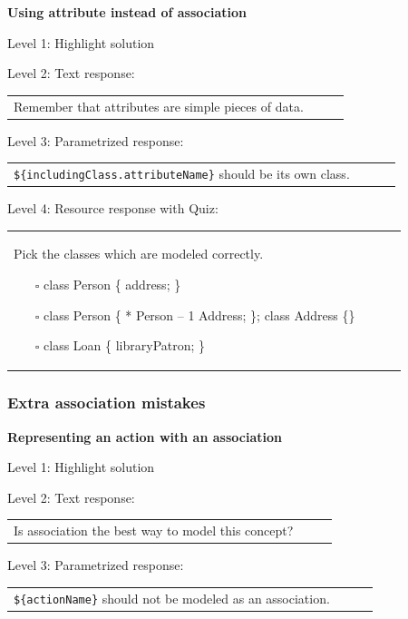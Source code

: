\noindent \textbf{Using attribute instead of association} \medskip

\noindent Level 1: Highlight solution \medskip

\noindent Level 2: Text response: \medskip

\begin{tabular}{|p{0.9\linewidth}}
Remember that attributes are simple pieces of data.
\end{tabular} \medskip

\noindent Level 3: Parametrized response: \medskip

\begin{tabular}{|p{0.9\linewidth}}
\verb|${includingClass.attributeName}| should be its own class.
\end{tabular} \medskip

\noindent Level 4: Resource response with Quiz: \medskip

\begin{tabular}{|p{0.9\linewidth}}
Pick the classes which are modeled correctly.

\begin{itemize}
    \item[$\square$] class Person \{ address; \}
    \item[$\square$] class Person \{ * Person -- 1 Address; \}; class Address \{\}
    \item[$\square$] class Loan \{ libraryPatron; \}
\end{itemize}

\end{tabular} \medskip


\subsubsection{Extra association mistakes}

\noindent \textbf{Representing an action with an association} \medskip

\noindent Level 1: Highlight solution \medskip

\noindent Level 2: Text response: \medskip

\begin{tabular}{|p{0.9\linewidth}}
Is association the best way to model this concept?
\end{tabular} \medskip

\noindent Level 3: Parametrized response: \medskip

\begin{tabular}{|p{0.9\linewidth}}
\verb|${actionName}| should not be modeled as an association.
\end{tabular} \medskip

